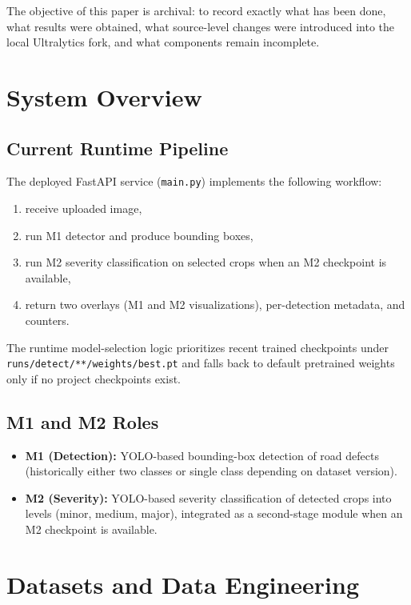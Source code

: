\documentclass[twocolumn]{article}
\begin{document}
The objective of this paper is archival: to record exactly what has been done, what results were obtained, what source-level changes were introduced into the local Ultralytics fork, and what components remain incomplete.

\section{System Overview}
\subsection{Current Runtime Pipeline}
The deployed FastAPI service (\texttt{main.py}) implements the following workflow:
\begin{enumerate}
    \item receive uploaded image,
    \item run M1 detector and produce bounding boxes,
    \item run M2 severity classification on selected crops when an M2 checkpoint is available,
    \item return two overlays (M1 and M2 visualizations), per-detection metadata, and counters.
\end{enumerate}

The runtime model-selection logic prioritizes recent trained checkpoints under \texttt{runs/detect/**/weights/best.pt} and falls back to default pretrained weights only if no project checkpoints exist.

\subsection{M1 and M2 Roles}
\begin{itemize}
    \item \textbf{M1 (Detection):} YOLO-based bounding-box detection of road defects (historically either two classes or single class depending on dataset version).
    \item \textbf{M2 (Severity):} YOLO-based severity classification of detected crops into levels (minor, medium, major), integrated as a second-stage module when an M2 checkpoint is available.
\end{itemize}

\section{Datasets and Data Engineering}
\end{document}
